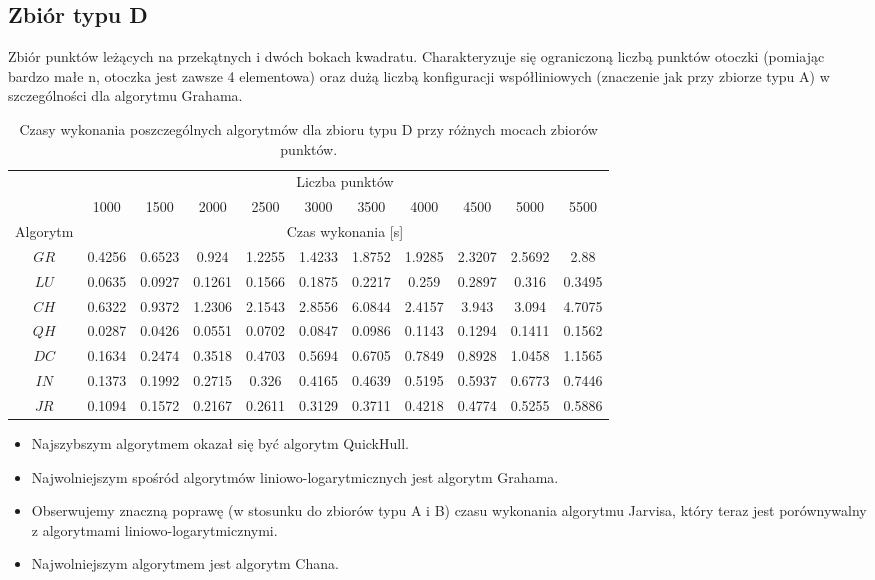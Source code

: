 \documentclass[11pt]{article}
\theoremstyle{remark} \newtheorem{definition}{def.}
\theoremstyle{definition} \newtheorem{twierdzenie}{tw.}
\begin{document}
\subsection{Zbiór typu D}

Zbiór punktów leżących na przekątnych i dwóch bokach kwadratu. Charakteryzuje się ograniczoną liczbą punktów otoczki (pomiając bardzo małe n, otoczka jest zawsze 4 elementowa) oraz dużą liczbą konfiguracji 
współliniowych (znaczenie jak przy zbiorze typu A) w szczególności dla algorytmu Grahama. 



\begin{table}[h]
\centering
\caption{Czasy wykonania poszczególnych algorytmów dla zbioru typu D przy różnych mocach zbiorów punktów.}
\label{tab:kw}
\begin{tabular}{c|c|c|c|c|c|c|c|c|c|c|}
\cline{2-11}
\multicolumn{1}{l|}{} & \multicolumn{10}{c|}{Liczba punktów} \\ \cline{2-11} 
\multicolumn{1}{l|}{} & 1000 & 1500 & 2000 & 2500 & 3000 & 3500 & 4000 & 4500 & 5000 & 5500 \\ \hline
\multicolumn{1}{|c|}{Algorytm} & \multicolumn{10}{c|}{Czas wykonania {[}s{]}} \\ \hline
\multicolumn{1}{|c|}{$GR$} & 0.4256 & 0.6523 & 0.924 & 1.2255 & 1.4233 & 1.8752 & 1.9285 & 2.3207 & 2.5692 & 2.88 \\ \hline
\multicolumn{1}{|c|}{$LU$} & 0.0635 & 0.0927 & 0.1261 & 0.1566 & 0.1875 & 0.2217 & 0.259 & 0.2897 & 0.316 & 0.3495 \\ \hline
\multicolumn{1}{|c|}{$CH$} & 0.6322 & 0.9372 & 1.2306 & 2.1543 & 2.8556 & 6.0844 & 2.4157 & 3.943 & 3.094 & 4.7075 \\ \hline
\multicolumn{1}{|c|}{$QH$} & 0.0287 & 0.0426 & 0.0551 & 0.0702 & 0.0847 & 0.0986 & 0.1143 & 0.1294 & 0.1411 & 0.1562 \\ \hline
\multicolumn{1}{|c|}{$DC$} & 0.1634 & 0.2474 & 0.3518 & 0.4703 & 0.5694 & 0.6705 & 0.7849 & 0.8928 & 1.0458 & 1.1565 \\ \hline
\multicolumn{1}{|c|}{$IN$} & 0.1373 & 0.1992 & 0.2715 & 0.326 & 0.4165 & 0.4639 & 0.5195 & 0.5937 & 0.6773 & 0.7446 \\ \hline
\multicolumn{1}{|c|}{$JR$} & 0.1094 & 0.1572 & 0.2167 & 0.2611 & 0.3129 & 0.3711 & 0.4218 & 0.4774 & 0.5255 & 0.5886 \\ \hline
\end{tabular}
\end{table}

\begin{itemize}
    \item Najszybszym algorytmem okazał się być algorytm QuickHull. 
    \item Najwolniejszym spośród algorytmów liniowo-logarytmicznych jest algorytm Grahama. 
    \item Obserwujemy znaczną poprawę (w stosunku do zbiorów typu A i B) czasu wykonania algorytmu Jarvisa, który teraz jest porównywalny z algorytmami liniowo-logarytmicznymi. 
    \item Najwolniejszym algorytmem jest algorytm Chana. 
\end{itemize}
\end{document}
